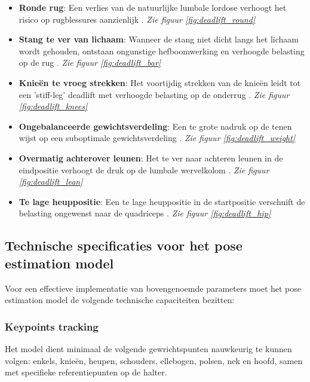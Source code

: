 \begin{itemize}
    \item \textbf{Ronde rug}: Een verlies van de natuurlijke lumbale lordose verhoogt het risico op rugblessures aanzienlijk \autocite{Bengtsson2018}. \textit{Zie figuur \ref{fig:deadlift_round}}
    
    \item \textbf{Stang te ver van lichaam}: Wanneer de stang niet dicht langs het lichaam wordt gehouden, ontstaan ongunstige hefboomwerking en verhoogde belasting op de rug \autocite{Bengtsson2018}. \textit{Zie figuur \ref{fig:deadlift_bar}}
    
    \item \textbf{Knieën te vroeg strekken}: Het voortijdig strekken van de knieën leidt tot een 'stiff-leg' deadlift met verhoogde belasting op de onderrug \autocite{Bengtsson2018}. \textit{Zie figuur \ref{fig:deadlift_knees}}
    
    \item \textbf{Ongebalanceerde gewichtsverdeling}: Een te grote nadruk op de tenen wijst op een suboptimale gewichtsverdeling \autocite{Ronai2020}. \textit{Zie figuur \ref{fig:deadlift_weight}}
    
    \item \textbf{Overmatig achterover leunen}: Het te ver naar achteren leunen in de eindpositie verhoogt de druk op de lumbale wervelkolom \autocite{Ronai2020}. \textit{Zie figuur \ref{fig:deadlift_lean}}
    
    \item \textbf{Te lage heuppositie}: Een te lage heuppositie in de startpositie verschuift de belasting ongewenst naar de quadriceps \autocite{Bird2010}. \textit{Zie figuur \ref{fig:deadlift_hip}}
\end{itemize}

\subsection{Technische specificaties voor het pose estimation model}

Voor een effectieve implementatie van bovengenoemde parameters moet het pose estimation model de volgende technische capaciteiten bezitten:

\subsubsection{Keypoints tracking}
Het model dient minimaal de volgende gewrichtspunten nauwkeurig te kunnen volgen: enkels, knieën, heupen, schouders, ellebogen, polsen, nek en hoofd, samen met specifieke referentiepunten op de halter.

